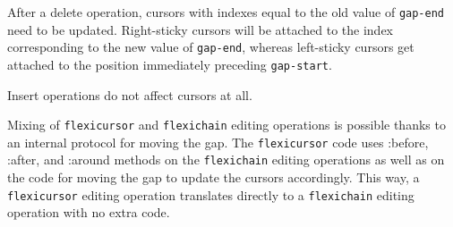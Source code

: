 \documentclass[11pt]{article}
\begin{document}
After a delete operation, cursors with indexes equal to the old value
of \texttt{gap-end} need to be updated.  Right-sticky cursors will be
attached to the index corresponding to the new value of
\texttt{gap-end}, whereas left-sticky cursors get attached to the
position immediately preceding \texttt{gap-start}. 

Insert operations do not affect cursors at all. 

Mixing of \texttt{flexicursor} and \texttt{flexichain} editing
operations is possible thanks to an internal protocol for moving the
gap.  The \texttt{flexicursor} code uses :before, :after, and :around
methods on the \texttt{flexichain} editing operations as well as on
the code for moving the gap to update the cursors accordingly.  This
way, a \texttt{flexicursor} editing operation translates directly to a
\texttt{flexichain} editing operation with no extra code.
\end{document}

